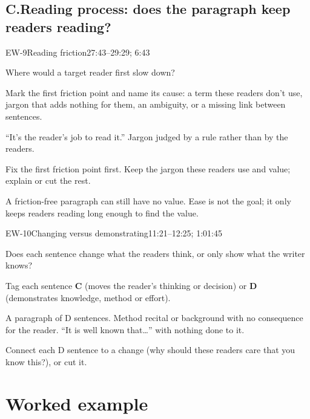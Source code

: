 \documentclass[11pt]{article}
\begin{document}
\subsection{\texorpdfstring{C.\enspace}{C. }Reading process: does the paragraph keep readers reading?}

\begin{criterion}{EW-9}{Reading friction}{27:43--29:29; 6:43}
\begin{fields}
  \item[Ask] Where would a target reader first slow down?
  \item[Check] Mark the first friction point and name its cause: a term these readers don't use, jargon that
    adds nothing for them, an ambiguity, or a missing link between sentences.
  \item[Red flags] ``It's the reader's job to read it.'' Jargon judged by a rule rather than by the readers.
  \item[Fix] Fix the first friction point first. Keep the jargon these readers use and value; explain or cut the
    rest.
  \item[Note] A friction-free paragraph can still have no value. Ease is not the goal; it only keeps readers
    reading long enough to find the value.
\end{fields}
\end{criterion}

\begin{criterion}{EW-10}{Changing versus demonstrating}{11:21--12:25; 1:01:45}
\begin{fields}
  \item[Ask] Does each sentence change what the readers think, or only show what the writer knows?
  \item[Check] Tag each sentence \textbf{C} (moves the reader's thinking or decision) or \textbf{D}
    (demonstrates knowledge, method or effort).
  \item[Red flags] A paragraph of D sentences. Method recital or background with no consequence for the reader.
    ``It is well known that\ldots'' with nothing done to it.
  \item[Fix] Connect each D sentence to a change (why should these readers care that you know this?), or cut it.
\end{fields}
\end{criterion}

\clearpage
\section{Worked example}
\end{document}
